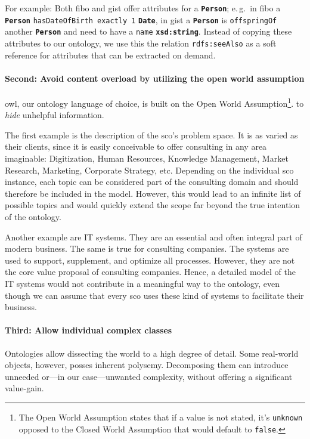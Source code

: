 \documentclass[a4paper, DIV=13, BCOR=0cm]{scrbook}
\newcommand{\eg}{e.\,g.\ }
\newcommand{\class}[1]{\texttt{\textbf{#1}}}
\newcommand{\relation}[1]{\texttt{#1}}
\begin{document}
For example: Both \gls{fibo} and \gls{gist} offer attributes for a \class{Person}; \eg in \gls{fibo} a \class{Person} \relation{hasDateOfBirth exactly 1} \class{Date}, in \gls{gist} a \class{Person} is \relation{offspringOf} another \class{Person} and need to have a \relation{name} \class{xsd:string}. Instead of copying these attributes to our ontology, we use this the relation \relation{rdfs:seeAlso} \cite[https://www.w3.org/TR/rdf-schema/\#ch\_seealso]{brickley2014rdf} as a soft reference for attributes that can be extracted on demand.

\paragraph{Second: Avoid content overload by utilizing the open world assumption} \gls{owl}, our ontology language of choice, is built on the Open World Assumption\footnote{The Open World Assumption states that if a value is not stated, it's \texttt{unknown} opposed to the Closed World Assumption that would default to \texttt{false}.}. \cite[p.\,388--389]{moore2015context} \cite[p.\,299, 417]{Russell:2010aa} \cite[p.\,372]{hitzler2009foundations} to \textit{hide} unhelpful information.

The first example is the description of the \gls{sco}'s problem space. It is as varied as their clients, since it is easily conceivable to offer consulting in any area imaginable: Digitization, Human Resources, Knowledge Management, Market Research, Marketing, Corporate Strategy, etc. Depending on the individual \gls{sco} instance, each topic can be considered part of the consulting domain and should therefore be included in the model. However, this would lead to an infinite list of possible topics and would quickly extend the scope far beyond the true intention of the ontology.

Another example are IT systems. They are an essential and often integral part of modern business. The same is true for consulting companies. The systems are used to support, supplement, and optimize all processes. However, they are not the core value proposal of consulting companies. Hence, a detailed model of the IT systems would not contribute in a meaningful way to the ontology, even though we can assume that every \gls{sco} uses these kind of systems to facilitate their business.

\paragraph{Third: Allow individual complex classes} Ontologies allow dissecting the world to a high degree of detail. Some real-world objects, however, posses inherent polysemy. Decomposing them can introduce unneeded or---in our case---unwanted complexity, without offering a significant value-gain.
\end{document}

